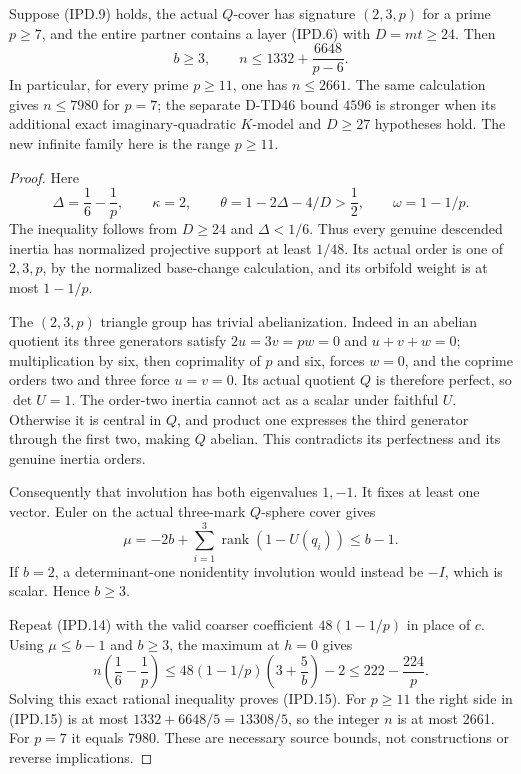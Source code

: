 \begin{corollary}
Suppose (IPD.9) holds, the actual \(Q\)-cover has signature
\((2,3,p)\) for a prime \(p\ge7\), and the entire partner
contains a layer (IPD.6) with \(D=mt\ge24\). Then
\[
 b\ge3,\qquad
 n\le1332+\frac{6648}{p-6}.
 \tag{IPD.15}
\]
In particular, for every prime \(p\ge11\), one has \(n\le2661\).
The same calculation gives \(n\le7980\) for \(p=7\);
the separate D-TD46 bound \(4596\) is stronger when its additional
exact imaginary-quadratic \(K\)-model and \(D\ge27\) hypotheses hold.
The new infinite family here is the range \(p\ge11\).
\end{corollary}

\begin{proof}
Here
\[
 \Delta=\frac16-\frac1p,\qquad \kappa=2,\qquad
 \theta=1-2\Delta-4/D>\frac12,
 \qquad \omega=1-1/p.
 \tag{IPD.16}
\]
The inequality follows from \(D\ge24\) and
\(\Delta<1/6\). Thus every genuine descended inertia has
normalized projective support at least \(1/48\). Its actual
order is one of \(2,3,p\), by the normalized base-change
calculation, and its orbifold weight is at most \(1-1/p\).

The \((2,3,p)\) triangle group has trivial abelianization.
Indeed in an abelian quotient its three generators satisfy
\(2u=3v=pw=0\) and \(u+v+w=0\); multiplication by six,
then coprimality of \(p\) and six, forces \(w=0\), and
the coprime orders two and three force \(u=v=0\).
Its actual quotient \(Q\) is therefore perfect, so
\(\det U=1\). The order-two inertia cannot act as a scalar
under faithful \(U\). Otherwise it is central in \(Q\),
and product one expresses the third generator through the
first two, making \(Q\) abelian. This contradicts its
perfectness and its genuine inertia orders.

Consequently that involution has both eigenvalues \(1,-1\).
It fixes at least one vector. Euler on the actual three-mark
\(Q\)-sphere cover gives
\[
 \mu=-2b+\sum_{i=1}^3\operatorname{rank}(1-U(q_i))
                      \le b-1.
 \tag{IPD.17}
\]
If \(b=2\), a determinant-one nonidentity involution would
instead be \(-I\), which is scalar. Hence \(b\ge3\).

Repeat (IPD.14) with the valid coarser coefficient
\(48(1-1/p)\) in place of \(c\). Using \(\mu\le b-1\)
and \(b\ge3\), the maximum at \(h=0\) gives
\[
 n\left(\frac16-\frac1p\right)
 \le48(1-1/p)\left(3+\frac5b\right)-2
 \le222-\frac{224}{p}.
 \tag{IPD.18}
\]
Solving this exact rational inequality proves (IPD.15).
For \(p\ge11\) the right side in (IPD.15) is at most
\(1332+6648/5=13308/5\), so the integer \(n\) is at most
2661. For \(p=7\) it equals 7980. These are necessary source
bounds, not constructions or reverse implications.
\end{proof}


